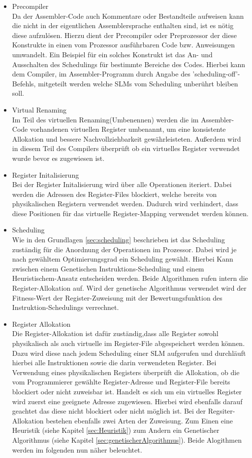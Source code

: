 \begin{itemize}
	\item Precompiler\\
		Da der Assembler-Code auch Kommentare oder Bestandteile aufweisen kann die nicht in der eigentlichen Assemblersprache enthalten sind, ist es nötig diese aufzulösen. Hierzu dient der Precompiler oder Preprozessor der diese Konstrukte in einen vom Prozessor ausführbaren Code bzw. Anweisungen umwandelt. Ein Beispiel für ein solches Konstrukt ist das An- und Ausschalten des Schedulings für bestimmte Bereiche des Codes. Hierbei kann dem Compiler, im Assembler-Programm durch Angabe des 'scheduling-off'-Befehls, mitgeteilt werden welche SLMs vom Scheduling unberührt bleiben soll.
	\item Virtual Renaming\\
		Im Teil des virtuellen Renaming(Umbenennen) werden die im Assembler-Code vorhandenen virtuellen Register umbenannt, um eine konsistente Allokation und bessere Nachvollziehbarkeit gewährleisteten. Außerdem wird in diesem Teil des Compilers überprüft ob ein virtuelles Register verwendet wurde bevor es zugewiesen ist.
	\item Register Initalisierung\\
		Bei der Register Initalisierung wird über alle Operationen iteriert. Dabei werden die Adressen des Register-Files blockiert, welche bereits von physikalischen Registern verwendet werden. Dadurch wird verhindert, dass diese Positionen für das virtuelle Register-Mapping verwendet werden können.
	\item Scheduling\\
		Wie in den Grundlagen \ref{sec:scheduling} beschrieben  ist das Scheduling zuständig für die Anordnung der Operationen im Prozessor. Dabei wird je nach gewähltem Optimierungsgrad ein Scheduling gewählt. Hierbei Kann zwischen einem Genetischen Instruktions-Scheduling und einem Heuristischem-Ansatz entscheiden werden. Beide Algorithmen rufen intern die Register-Allokation auf. Wird der genetische Algorithmus verwendet wird der Fitness-Wert der Register-Zuweisung mit der Bewertungsfunktion des Instruktion-Schedulings verrechnet.
	\item Register Allokation\\
		Die Register-Allokation ist dafür zuständig,dass alle Register sowohl physikalisch als auch virtuelle im Register-File abgespeichert werden können. Dazu wird diese nach jedem Scheduling einer SLM aufgerufen und durchläuft hierbei alle Instruktionen sowie die darin verwendeten Register. Bei Verwendung eines physikalischen Registers überprüft die Allokation, ob die vom Programmierer gewählte Register-Adresse und Register-File bereits blockiert oder nicht zuweisbar ist. Handelt es sich um ein virtuelles Register wird zuerst eine geeignete Adresse zugewiesen. Hierbei wird ebenfalls darauf geachtet das diese nicht blockiert oder nicht möglich ist.
		Bei der Regsiter-Allokation bestehen ebenfalls zwei Arten der Zuweisung. Zum Einen eine Heuristik (siehe Kapitel \ref{sec:Heuristik}) zum Andern ein Genetischer Algorithmus (siehe Kapitel \ref{sec:genetischerAlgorithmus}). Beide Alogithmen werden im folgenden nun näher beleuchtet.
\end{itemize}


